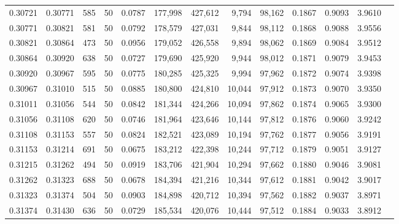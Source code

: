 \begin{tabular}{rrrrrrrrrrrrr}
0.30721 & 0.30771 &   585 &  50 &                                     0.0787 & 177,998 & 427,612 &   9,794 &  98,162 & 0.1867 & 0.9093 & 3.9610 \\
0.30771 & 0.30821 &   581 &  50 &                                     0.0792 & 178,579 & 427,031 &   9,844 &  98,112 & 0.1868 & 0.9088 & 3.9556 \\
0.30821 & 0.30864 &   473 &  50 &                                     0.0956 & 179,052 & 426,558 &   9,894 &  98,062 & 0.1869 & 0.9084 & 3.9512 \\
0.30864 & 0.30920 &   638 &  50 &                                     0.0727 & 179,690 & 425,920 &   9,944 &  98,012 & 0.1871 & 0.9079 & 3.9453 \\
0.30920 & 0.30967 &   595 &  50 &                                     0.0775 & 180,285 & 425,325 &   9,994 &  97,962 & 0.1872 & 0.9074 & 3.9398 \\
0.30967 & 0.31010 &   515 &  50 &                                     0.0885 & 180,800 & 424,810 &  10,044 &  97,912 & 0.1873 & 0.9070 & 3.9350 \\
0.31011 & 0.31056 &   544 &  50 &                                     0.0842 & 181,344 & 424,266 &  10,094 &  97,862 & 0.1874 & 0.9065 & 3.9300 \\
0.31056 & 0.31108 &   620 &  50 &                                     0.0746 & 181,964 & 423,646 &  10,144 &  97,812 & 0.1876 & 0.9060 & 3.9242 \\
0.31108 & 0.31153 &   557 &  50 &                                     0.0824 & 182,521 & 423,089 &  10,194 &  97,762 & 0.1877 & 0.9056 & 3.9191 \\
0.31153 & 0.31214 &   691 &  50 &                                     0.0675 & 183,212 & 422,398 &  10,244 &  97,712 & 0.1879 & 0.9051 & 3.9127 \\
0.31215 & 0.31262 &   494 &  50 &                                     0.0919 & 183,706 & 421,904 &  10,294 &  97,662 & 0.1880 & 0.9046 & 3.9081 \\
0.31262 & 0.31323 &   688 &  50 &                                     0.0678 & 184,394 & 421,216 &  10,344 &  97,612 & 0.1881 & 0.9042 & 3.9017 \\
0.31323 & 0.31374 &   504 &  50 &                                     0.0903 & 184,898 & 420,712 &  10,394 &  97,562 & 0.1882 & 0.9037 & 3.8971 \\
0.31374 & 0.31430 &   636 &  50 &                                     0.0729 & 185,534 & 420,076 &  10,444 &  97,512 & 0.1884 & 0.9033 & 3.8912 \\

\end{tabular}
